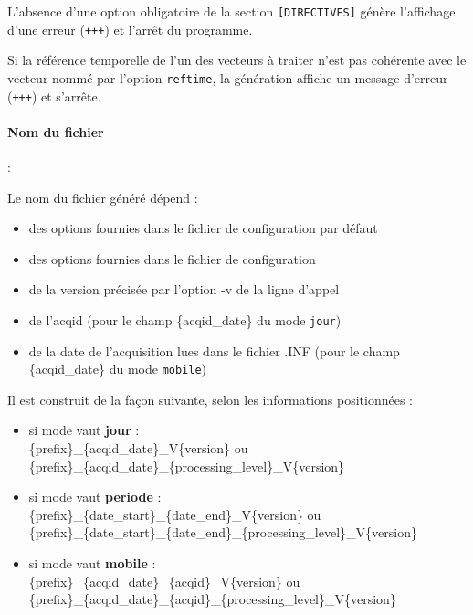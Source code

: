 \begin{warning}
L'absence d'une option obligatoire de la section
\texttt{[DIRECTIVES]} génère l'affichage d'une erreur (\texttt{+++})
et l'arrêt du programme.
\end{warning}

\begin{warning}
Si la référence temporelle de l'un des vecteurs à traiter n'est pas cohérente
avec le vecteur nommé par l'option \texttt{reftime}, la génération
affiche un message d'erreur (\texttt{+++}) et s'arrête.
\end{warning}


\paragraph{Nom du fichier \netcdf} : \label{ref:nom_NetCDF}

Le nom du fichier \netcdf généré dépend :

\begin{itemize}
\item
  des options fournies dans le fichier de configuration par défaut
\item
  des options fournies dans le fichier de configuration
\item
  de la version précisée par l'option -v de la ligne d'appel
\item
  de l'acqid (pour le champ \{acqid\_date\} du mode \texttt{jour})
\item
  de la date de l'acquisition lues dans le fichier .INF (pour le champ
  \{acqid\_date\} du mode \texttt{mobile})
\end{itemize}

\medbreak
Il est construit de la façon suivante, selon les informations positionnées :

\begin{itemize}
\item
  si mode vaut \textbf{jour} : \\
    \{prefix\}\_\{acqid\_date\}\_V\{version\} ou \\
    \{prefix\}\_\{acqid\_date\}\_\{processing\_level\}\_V\{version\}
    \medbreak

\item
  si mode vaut \textbf{periode} : \\
    \{prefix\}\_\{date\_start\}\_\{date\_end\}\_V\{version\} ou \\
    \{prefix\}\_\{date\_start\}\_\{date\_end\}\_\{processing\_level\}\_V\{version\}
    \medbreak

\item
  si mode vaut \textbf{mobile} : \\
    \{prefix\}\_\{acqid\_date\}\_\{acqid\}\_V\{version\} ou \\
    \{prefix\}\_\{acqid\_date\}\_\{acqid\}\_\{processing\_level\}\_V\{version\} \\
\end{itemize}


